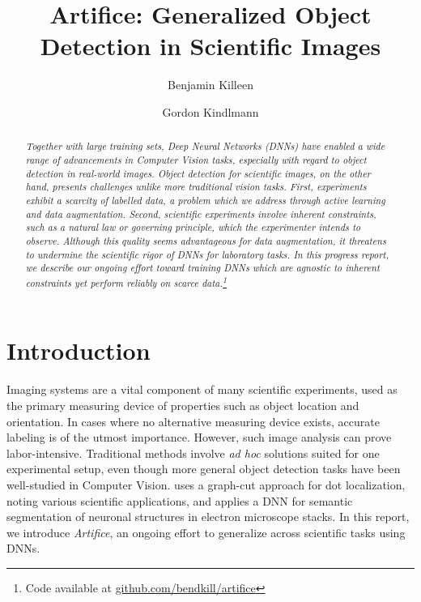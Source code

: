 \documentclass[twocolumn, 10pt]{asme2ej} %
\title{Artifice: Generalized Object Detection in Scientific Images}
\author{Benjamin Killeen
  \affiliation{
    \href{mailto:killeen@uchicago.edu}{killeen@uchicago.edu}
  }
}
\author{Gordon Kindlmann \affiliation{
    \href{mailto:glk@uchicago.edu}{glk@uchicago.edu}
  }
}
\begin{document}
\maketitle

\begin{abstract}
  {\it Together with large training sets, Deep Neural Networks (DNNs) have
    enabled a wide range of advancements in Computer Vision tasks, especially
    with regard to object detection in real-world images. Object detection for
    scientific images, on the other hand, presents challenges unlike more
    traditional vision tasks. First, experiments exhibit a scarcity of labelled
    data, a problem which we address through active learning and data
    augmentation. Second, scientific experiments involve inherent constraints,
    such as a natural law or governing principle, which the experimenter intends
    to observe. Although this quality seems advantageous for data augmentation,
    it threatens to undermine the scientific rigor of DNNs for laboratory
    tasks. In this progress report, we describe our ongoing effort toward
    training DNNs which are agnostic to inherent constraints yet perform
    reliably on scarce data.\footnote{Code available at
      \href{https://github.com/bendkill/artifice}
      {github.com/bendkill/artifice}}}
\end{abstract}

\section{Introduction}
\label{sec:introduction}

Imaging systems are a vital component of many scientific experiments, used as
the primary measuring device of properties such as object location and
orientation. In cases where no alternative measuring device exists, accurate
labeling is of the utmost importance. However, such image analysis can prove
labor-intensive. Traditional methods involve \emph{ad hoc} solutions suited for
one experimental setup, even though more general object detection tasks have
been well-studied in Computer Vision. \cite{bernardis_finding_2010} uses a
graph-cut approach for dot localization, noting various scientific applications,
and \cite{ronneberger_u-net:_2015} applies a DNN for semantic segmentation of
neuronal structures in electron microscope stacks. In this report, we introduce
\emph{Artifice}, an ongoing effort to generalize across scientific tasks using
DNNs.
\end{document}
